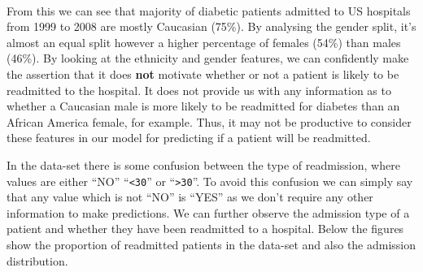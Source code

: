 \documentclass[11pt]{report}
\newcommand{\linespace}{\vspace{0.3cm}\noindent}
\begin{document}
\

\linespace
From this we can see that majority of diabetic patients admitted to US hospitals from 1999 to 2008 are mostly Caucasian (75\%). By analysing the gender split, it's almost an equal split however a higher percentage of females (54\%) than males (46\%). By looking at the ethnicity and gender features, we can confidently make the assertion that it does \textbf{not} motivate whether or not a patient is likely to be readmitted to the hospital. It does not provide us with any information as to whether a Caucasian male is more likely to be readmitted for diabetes than an African America female, for example. Thus, it may not be productive to consider these features in our model for predicting if a patient will be readmitted. 

\linespace
In the data-set there is some confusion between the type of readmission, where values are either ``NO'' ``\texttt{<30}'' or ``\texttt{>30}''. To avoid this confusion we can simply say that any value which is not ``NO'' is ``YES'' as we don't require any other information to make predictions. We can further observe the admission type of a patient and whether they have been readmitted to a hospital. Below the figures show the proportion of readmitted patients in the data-set and also the admission distribution.
\end{document}
